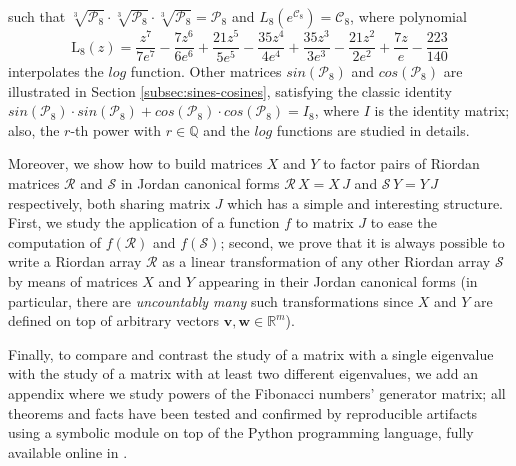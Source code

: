 such that %
$\sqrt[3]{\mathcal{P}_8} \cdot \sqrt[3]{\mathcal{P}_8} \cdot
\sqrt[3]{\mathcal{P}_8} =\mathcal{P}_8$ and
$L_{8}\left({e^{\mathcal{C}_{8}}}\right) = \mathcal{C}_{8}$, where polynomial
\begin{displaymath}
\operatorname{L_{ 8 }}{\left (z \right )} = \frac{z^{7}}{7 e^{7}} - \frac{7 z^{6}}{6 e^{6}} + \frac{21 z^{5}}{5 e^{5}} - \frac{35 z^{4}}{4 e^{4}} + \frac{35 z^{3}}{3 e^{3}} - \frac{21 z^{2}}{2 e^{2}} + \frac{7 z}{e} - \frac{223}{140}
\end{displaymath}
interpolates the $log$ function. Other matrices $sin(\mathcal{P}_8)$ and
$cos(\mathcal{P}_8)$ are illustrated in Section \ref{subsec:sines-cosines},
satisfying the classic identity $sin(\mathcal{P}_8)\cdot sin(\mathcal{P}_8)+
cos(\mathcal{P}_8)\cdot cos(\mathcal{P}_8)=I_{8}$, where $I$ is the identity
matrix; also, the $r$-th power with $r\in\mathbb{Q}$ and the $log$ functions
are studied in details.

Moreover, we show how to build matrices $X$ and $Y$ to factor pairs of Riordan
matrices $\mathcal{R}$ and $\mathcal{S}$ in  Jordan canonical forms
$\mathcal{R}\,X=X\,J$ and $\mathcal{S}\,Y=Y\,J$ respectively, both sharing
matrix $J$ which has a simple and interesting structure. First, we study the
application of a function $f$ to matrix $J$  to ease the computation of
$f(\mathcal{R})$ and $f(\mathcal{S})$; second, we prove that it is always
possible to write a Riordan array $\mathcal{R}$ as a linear transformation of
any other Riordan array $\mathcal{S}$ by means of matrices $X$ and $Y$
appearing in their Jordan canonical forms (in particular, there are
\textit{uncountably many} such transformations since $X$ and $Y$ are defined on
top of arbitrary vectors $\boldsymbol{v},\boldsymbol{w}\in\mathbb{R}^{m}$).


Finally, to compare and contrast the study of a matrix with a single eigenvalue
with the study of a matrix with at least two different eigenvalues, we add an
appendix where we study powers of the Fibonacci numbers' generator matrix;
all theorems and facts have been tested and confirmed by reproducible artifacts
using a symbolic module on top of the Python programming language, fully
available online in \citep{MN:simulation:method:repo}.


